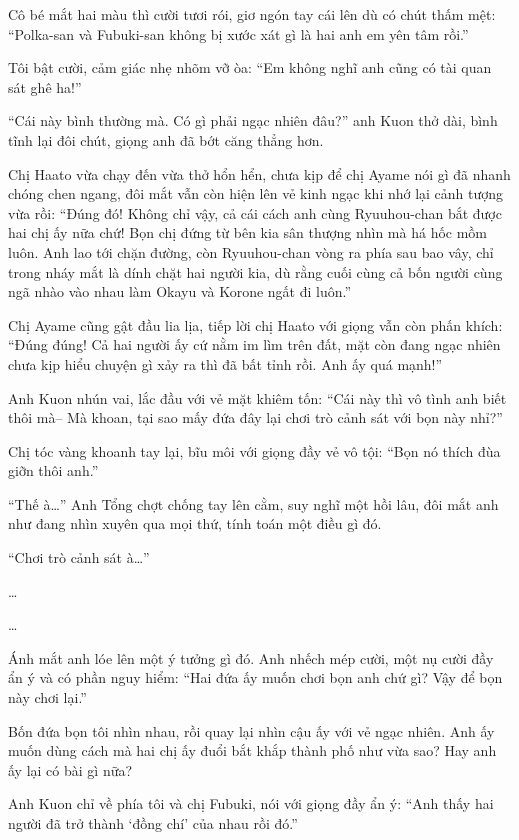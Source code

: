 \documentclass[../main.tex]{subfiles}
\begin{document}
Cô bé mắt hai màu thì cười tươi rói, giơ ngón tay cái lên dù có chút thấm mệt: ``Polka-san và Fubuki-san không bị xước xát gì là hai anh em yên tâm rồi.''

Tôi bật cười, cảm giác nhẹ nhõm vỡ òa: ``Em không nghĩ anh cũng có tài quan sát ghê ha!''

``Cái này bình thường mà. Có gì phải ngạc nhiên đâu?'' anh Kuon thở dài, bình tĩnh lại đôi chút, giọng anh đã bớt căng thẳng hơn.

Chị Haato vừa chạy đến vừa thở hổn hển, chưa kịp để chị Ayame nói gì đã nhanh chóng chen ngang, đôi mắt vẫn còn hiện lên vẻ kinh ngạc khi nhớ lại cảnh tượng vừa rồi: ``Đúng đó! Không chỉ vậy, cả cái cách anh cùng Ryuuhou-chan bắt được hai chị ấy nữa chứ! Bọn chị đứng từ bên kia sân thượng nhìn mà há hốc mồm luôn. Anh lao tới chặn đường, còn Ryuuhou-chan vòng ra phía sau bao vây, chỉ trong nháy mắt là dính chặt hai người kia, dù rằng cuối cùng cả bốn người cùng ngã nhào vào nhau làm Okayu và Korone ngất đi luôn.''

Chị Ayame cũng gật đầu lia lịa, tiếp lời chị Haato với giọng vẫn còn phấn khích: ``Đúng đúng! Cả hai người ấy cứ nằm im lìm trên đất, mặt còn đang ngạc nhiên chưa kịp hiểu chuyện gì xảy ra thì đã bất tỉnh rồi. Anh ấy quá mạnh!''

Anh Kuon nhún vai, lắc đầu với vẻ mặt khiêm tốn: ``Cái này thì vô tình anh biết thôi mà-- Mà khoan, tại sao mấy đứa đây lại chơi trò cảnh sát với bọn này nhỉ?''

Chị tóc vàng khoanh tay lại, bĩu môi với giọng đầy vẻ vô tội: ``Bọn nó thích đùa giỡn thôi anh.''

``Thế à\dots'' Anh Tổng chợt chống tay lên cằm, suy nghĩ một hồi lâu, đôi mắt anh như đang nhìn xuyên qua mọi thứ, tính toán một điều gì đó.

``Chơi trò cảnh sát à\dots''

\dots

\dots

Ánh mắt anh lóe lên một ý tưởng gì đó. Anh nhếch mép cười, một nụ cười đầy ẩn ý và có phần nguy hiểm: ``Hai đứa ấy muốn chơi bọn anh chứ gì? Vậy để bọn này chơi lại.''

Bốn đứa bọn tôi nhìn nhau, rồi quay lại nhìn cậu ấy với vẻ ngạc nhiên. Anh ấy muốn dùng cách mà hai chị ấy đuổi bắt khắp thành phố như vừa sao? Hay anh ấy lại có bài gì nữa?

Anh Kuon chỉ về phía tôi và chị Fubuki, nói với giọng đầy ẩn ý: ``Anh thấy hai người đã trở thành `đồng chí' của nhau rồi đó.''
\end{document}
